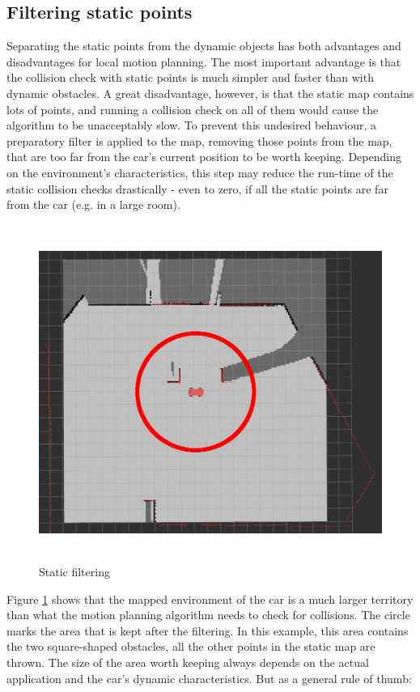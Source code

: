 \subsection{Filtering static points}
Separating the static points from the dynamic objects has both advantages and disadvantages for local motion planning. The most important advantage is that the collision check with static points is much simpler and faster than with dynamic obstacles. A great disadvantage, however, is that the static map contains lots of points, and running a collision check on all of them would cause the algorithm to be unacceptably slow. To prevent this undesired behaviour, a preparatory filter is applied to the map, removing those points from the map, that are too far from the car's current position to be worth keeping. Depending on the environment's characteristics, this step may reduce the run-time of the static collision checks drastically - even to zero, if all the static points are far from the car (e.g. in a large room).

\begin{figure}[!ht]
    \centering
    \includegraphics[height=110mm]{figures/raw/jpeg/rviz_2_near_static_objects_filter.jpg}
    \caption{Static filtering}
    \label{rviz_2_near_static_objects_filter}
\end{figure}

Figure \ref{rviz_2_near_static_objects_filter} shows that the mapped environment of the car is a much larger territory than what the motion planning algorithm needs to check for collisions. The circle marks the area that is kept after the filtering. In this example, this area contains the two square-shaped obstacles, all the other points in the static map are thrown. The size of the area worth keeping always depends on the actual application and the car's dynamic characteristics. But as a general rule of thumb:

